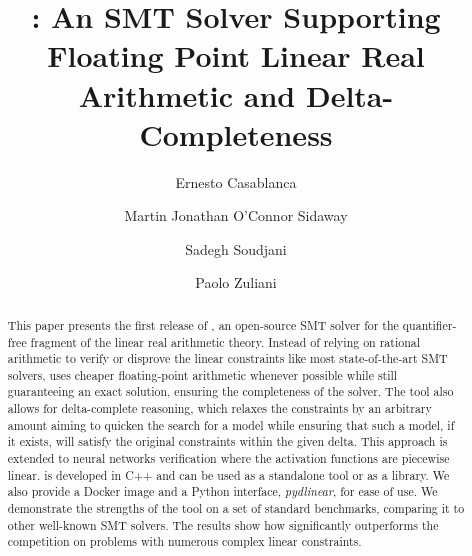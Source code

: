 \documentclass[runningheads]{llncs}
\begin{document}
\title{\dlinear: An SMT Solver Supporting Floating Point Linear Real Arithmetic and Delta-Completeness}
\titlerunning{\dlinear}

\author{Ernesto Casablanca
    \and
    Martin Jonathan O'Connor Sidaway
    \and
    Sadegh Soudjani
    \and
    Paolo Zuliani
}



\maketitle

\begin{abstract}
    This paper presents the first release of \dlinear, an open-source SMT solver for the quantifier-free fragment of the linear real arithmetic theory.
    Instead of relying on rational arithmetic to verify or disprove the linear constraints like most state-of-the-art SMT solvers, \dlinear uses cheaper floating-point arithmetic whenever possible while still guaranteeing an exact solution, ensuring the completeness of the solver.
    The tool also allows for delta-complete reasoning, which relaxes the constraints by an arbitrary amount aiming to quicken the search for a model while ensuring that such a model, if it exists, will satisfy the original constraints within the given delta.
    This approach is extended to neural networks verification where the activation functions are piecewise linear.
    \dlinear is developed in C++ and can be used as a standalone tool or as a library. We also provide a Docker image and a Python interface, \textit{pydlinear}, for ease of use.
    We demonstrate the strengths of the tool on a set of standard benchmarks, comparing it to other well-known SMT solvers.
    The results show how \dlinear significantly outperforms the competition on problems with numerous complex linear constraints.

\end{abstract}
\end{document}

